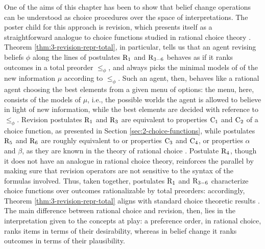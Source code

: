 One of the aims of this chapter has been to show
that belief change operations can be understood
as choice procedures over the space of interpretations.
The poster child for this approach is revision, 
which presents itself as a straightforward analogue
to choice functions studied in rational choice theory
\cite{Sen69,Sen70,GrantvZ09}.
Theorem \ref{thm:3-revision-repr-total}, in particular, 
tells us that an agent revising beliefs $\phi$ along the lines of
postulates $\mathrm{R}_{1}$ and $\mathrm{R}_{3-6}$ 
behaves as if it ranks outcomes
in a total preorder $\le_{\phi}$,
and always picks the minimal models of 
of the new information $\mu$ according to $\le_{\phi}$.
Such an agent, then, behaves like a rational agent
choosing the best elements from a given menu of options:
the menu, here, consists of the models of $\mu$, i.e., 
the possible worlds the agent is allowed to believe
in light of new information,
while the best elements are decided with reference to $\le_{\phi}$.
Revision postulates $\mathrm{R}_{1}$ and $\mathrm{R}_{3}$
are equivalent to properties $\mathrm{C}_{1}$ and $\mathrm{C}_{2}$
of a choice function, 
as presented in 
Section \ref{sec:2-choice-functions},
while postulates $\mathrm{R}_{5}$ and $\mathrm{R}_{6}$
are roughly equivalent to 
or properties $\mathrm{C}_{3}$ and $\mathrm{C}_{4}$, 
or properties $\alpha$ and $\beta$, 
as they are known in the theory of rational choice \cite{Sen69,Sen70}.
Postulate $\mathrm{R}_{4}$, though it does not have 
an analogue in rational choice theory,
reinforces the parallel by making sure that revision operators
are not sensitive to the syntax of the formulas involved.
Thus, taken together, postulates $\mathrm{R}_{1}$ and $\mathrm{R}_{3-6}$ 
characterize choice functions over outcomes 
rationalizable by total preorders:
accordingly, Theorem \ref{thm:3-revision-repr-total} aligns
with standard choice theoretic results \cite{Arrow51,Sen69}.
The main difference 
between rational choice and revision, then, 
lies in the interpretation given to the concepts at play:
a preference order, in rational choice, 
ranks items in terms of their desirability,
whereas in belief change it ranks outcomes in terms of 
their plausibility.

